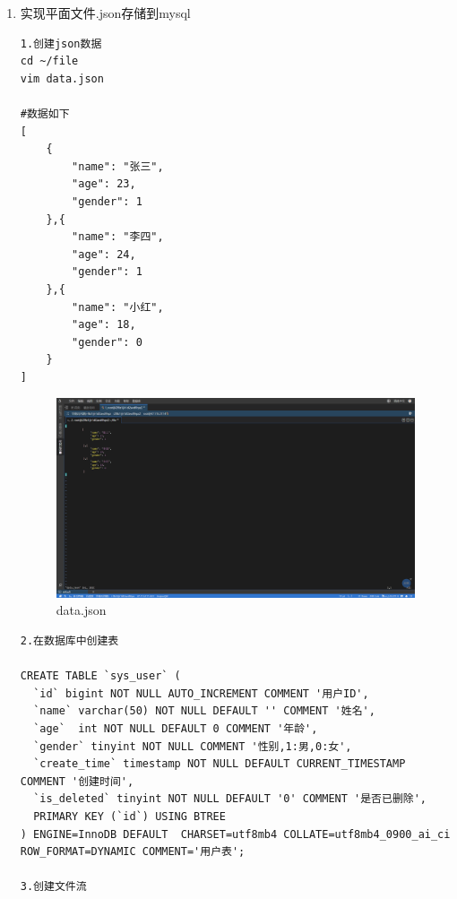 \documentclass{article}
\begin{document}
\begin{enumerate}
    \item 实现平面文件.json存储到mysql
    \begin{lstlisting}
1.创建json数据
cd ~/file
vim data.json

#数据如下
[
    {
        "name": "张三",
        "age": 23,
        "gender": 1
    },{
        "name": "李四",
        "age": 24,
        "gender": 1
    },{
        "name": "小红",
        "age": 18,
        "gender": 0
    }
]
    \end{lstlisting}
    \begin{figure}[htp]
        \centering
        \includegraphics[width=15cm]{data.json.png}
        \caption{data.json}
        \label{pic6}
    \end{figure}
    \begin{lstlisting}
2.在数据库中创建表

CREATE TABLE `sys_user` (
  `id` bigint NOT NULL AUTO_INCREMENT COMMENT '用户ID',
  `name` varchar(50) NOT NULL DEFAULT '' COMMENT '姓名',
  `age`  int NOT NULL DEFAULT 0 COMMENT '年龄',
  `gender` tinyint NOT NULL COMMENT '性别,1:男,0:女',
  `create_time` timestamp NOT NULL DEFAULT CURRENT_TIMESTAMP COMMENT '创建时间',
  `is_deleted` tinyint NOT NULL DEFAULT '0' COMMENT '是否已删除',
  PRIMARY KEY (`id`) USING BTREE
) ENGINE=InnoDB DEFAULT  CHARSET=utf8mb4 COLLATE=utf8mb4_0900_ai_ci ROW_FORMAT=DYNAMIC COMMENT='用户表';

3.创建文件流


\end{lstlisting}
\end{enumerate}
\end{document}
